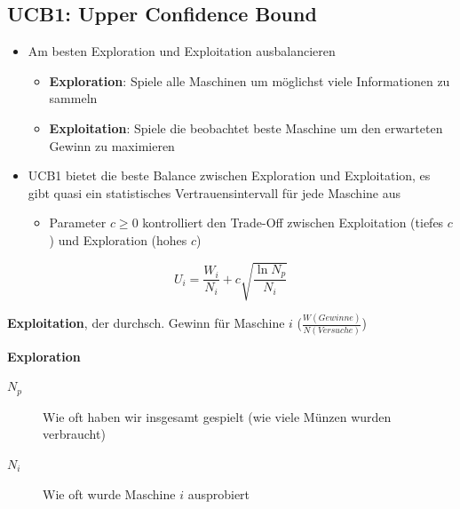 \documentclass[a4paper]{article}
\begin{document}
		\subsection{UCB1: Upper Confidence Bound}
		
		\begin{itemize}
			\item Am besten Exploration und Exploitation ausbalancieren
				\begin{itemize}
					\item \textbf{Exploration}: Spiele alle Maschinen um möglichst viele Informationen zu sammeln
					\item \textbf{Exploitation}: Spiele die beobachtet beste Maschine um den erwarteten Gewinn zu maximieren
				\end{itemize}
			\item UCB1 bietet die beste Balance zwischen Exploration und Exploitation, es gibt quasi ein statistisches Vertrauensintervall für jede Maschine aus
				\begin{itemize}
					\item Parameter $c \geq 0$ kontrolliert den Trade-Off zwischen Exploitation (tiefes $c$) und Exploration (hohes $c$)
				\end{itemize}
		\end{itemize}
	
		$$U_{i} = \frac{W_{i}}{N_{i}} + c \sqrt{\frac{\ln N_{p}}{N_{i}}}$$
		
		\vspace{1em}
		\begin{description}
			\item[$\frac{W_{i}}{N_{i}}$] \textbf{Exploitation}, der durchsch. Gewinn für Maschine $i$ ($\frac{W(Gewinne)}{N(Versuche)}$)
			\item
			\item[$\sqrt{\frac{\ln N_{p}}{N_{i}}}$] \textbf{Exploration}
				\begin{description}
					\item[$N_{p}$] Wie oft haben wir insgesamt gespielt (wie viele Münzen wurden verbraucht)
					\item[$N_{i}$] Wie oft wurde Maschine $i$ ausprobiert
				\end{description}
		\end{description}
		
		\newpage
		
\end{document}
